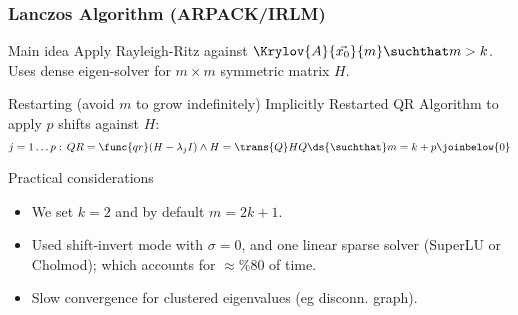  \begin{frame}
  \frametitle{Lanczos Algorithm (ARPACK/IRLM)}
  \begin{block}{Main idea}
    Apply Rayleigh-Ritz against
    $\Krylov{A}{\vec{x_0}}{m} \suchthat m > k$. Uses dense
    eigen-solver for $m \times m$ symmetric matrix $H$.
  \end{block}
  \begin{block}{Restarting (avoid $m$ to grow indefinitely)}
    Implicitly Restarted QR Algorithm to apply $p$ shifts against $H$:
    \[
    j=1 \ldots p:\, QR = \func{qr}(H - \lambda_j I) \land H = \trans{Q}HQ
    \ds{\suchthat}
    m = k + p
    \joinbelow{0}
    \]    
  \end{block}
  \begin{block}{Practical considerations}
    \begin{itemize}
    \item We set $k=2$ and by default $m=2k+1$.
    \item Used shift-invert mode with $\sigma=0$, and one linear sparse
      solver (SuperLU or Cholmod); which accounts for $\approx \%80$ of time.
    \item Slow convergence for clustered eigenvalues (eg disconn. graph).
    \end{itemize}
  \end{block}
\end{frame}
